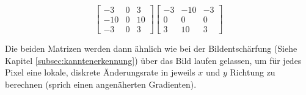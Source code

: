 \begin{equation}
	\begin{bmatrix}
  	-3     & 0      & 3 \\
	-10   & 0      & 10 \\
	-3     & 0      & 3
	\end{bmatrix}
	\begin{bmatrix}
  	-3     & -10   & -3\\
	0      & 0      & 0\\
	3      & 10    & 3
	\end{bmatrix}	
	\label{eq:scharrfilter}
\end{equation}
\cite{computervision_szeliski:2}

Die beiden Matrizen werden dann ähnlich wie bei der Bildentschärfung (Siehe Kapitel \ref{subsec:kanntenerkennung}) über das Bild laufen gelassen, um für jedes Pixel eine lokale, diskrete Änderungsrate in jeweils $x$ und $y$ Richtung zu berechnen (sprich einen angenäherten Gradienten).




